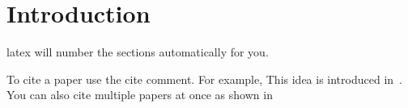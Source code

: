 \section{Introduction}

latex will number the sections automatically for you.

To cite a paper use the cite comment. For example, This
idea is introduced in~\cite{tosuncikm2002}. You can also
cite multiple papers at once as shown 
in~\cite{tosunicme2000,tosuncikm2002,tosunitcc2001,tosunMM01}